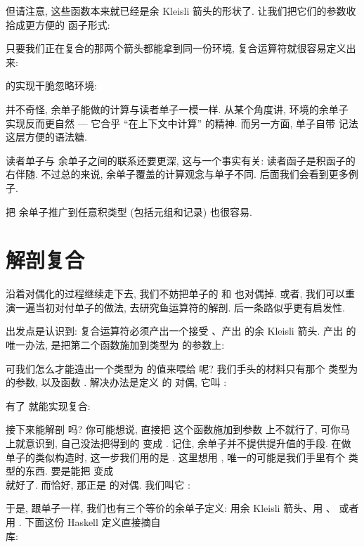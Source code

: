 但请注意, 这些函数本来就已经是余 Kleisli 箭头的形状了. 让我们把它们的参数收拾成更方便的
函子形式:

只要我们正在复合的那两个箭头都能拿到同一份环境, 复合运算符就很容易定义出来:

 的实现干脆忽略环境:

并不奇怪,  余单子能做的计算与读者单子一模一样. 从某个角度讲, 环境的余单子
实现反而更自然 --- 它合乎 ``在上下文中计算'' 的精神. 而另一方面, 单子自带  记法
这层方便的语法糖.

读者单子与  余单子之间的联系还要更深, 这与一个事实有关: 读者函子是积函子的
右伴随. 不过总的来说, 余单子覆盖的计算观念与单子不同. 后面我们会看到更多例子.

把  余单子推广到任意积类型 (包括元组和记录) 也很容易.

\section{解剖复合}

沿着对偶化的过程继续走下去, 我们不妨把单子的  和  也对偶掉. 或者,
我们可以重演一遍当初对付单子的做法, 去研究鱼运算符的解剖. 后一条路似乎更有启发性.

出发点是认识到: 复合运算符必须产出一个接受 、产出  的余 Kleisli 箭头.
产出  的唯一办法, 是把第二个函数施加到类型为  的参数上:

可我们怎么才能造出一个类型为  的值来喂给  呢? 我们手头的材料只有那个
类型为  的参数, 以及函数 . 解决办法是定义  的
对偶, 它叫 :

有了  就能实现复合:

接下来能解剖  吗? 你可能想说, 直接把  这个函数施加到参数
 上不就行了, 可你马上就意识到, 自己没法把得到的  变成 .
记住, 余单子并不提供提升值的手段. 在做单子的类似构造时, 这一步我们用的是 .
这里想用 , 唯一的可能是我们手里有个  类型的东西. 要是能把
 变成\\  就好了. 而恰好, 那正是  的对偶. 我们叫它
:

于是, 跟单子一样, 我们也有三个等价的余单子定义: 用余 Kleisli 箭头、用 、
或者用 . 下面这份 Haskell 定义直接摘自\\  库:

